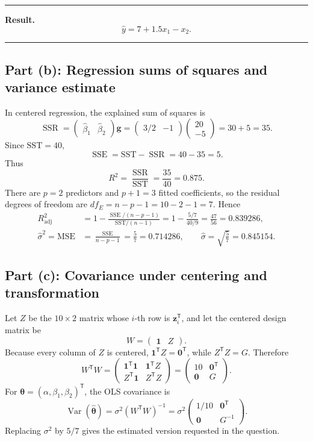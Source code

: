\documentclass[11pt]{article}
\newcommand{\trans}{\mathsf T}
\newcommand{\Var}{\operatorname{Var}}
\newcommand{\SSE}{\operatorname{SSE}}
\newcommand{\SSR}{\operatorname{SSR}}
\newcommand{\answer}[1]{\boxed{\displaystyle #1}}
\newenvironment{resultbox}
  {\par\medskip\noindent\begin{minipage}{\linewidth}
   \color{navy!90!black}\hrule\medskip\textbf{Result.}\ }
  {\medskip\hrule\end{minipage}\par\medskip}
\begin{document}
\begin{resultbox}
\[
  \answer{\hat y=7+1.5x_1-x_2}.
\]
\end{resultbox}

\subsection{Part (b): Regression sums of squares and variance estimate}

In centered regression, the explained sum of squares is
\[
 \SSR=\begin{pmatrix}\hat\beta_1&\hat\beta_2\end{pmatrix}\bm g
 =\begin{pmatrix}3/2&-1\end{pmatrix}
  \begin{pmatrix}20\\-5\end{pmatrix}
 =30+5=35.
\]
Since \(\mathrm{SST}=40\),
\[
 \SSE=\mathrm{SST}-\SSR=40-35=5.
\]
Thus
\[
 R^2=\frac{\SSR}{\mathrm{SST}}=\frac{35}{40}
 =\answer{0.875}.
\]
There are \(p=2\) predictors and \(p+1=3\) fitted coefficients, so the residual
degrees of freedom are \(df_E=n-p-1=10-2-1=7\). Hence
\begin{align*}
R_{\mathrm{adj}}^2
 &=1-\frac{\SSE/(n-p-1)}{\mathrm{SST}/(n-1)}
 =1-\frac{5/7}{40/9}
 =\frac{47}{56}
 =\answer{0.839286},\\
\hat\sigma^2=\mathrm{MSE}
&=\frac{\SSE}{n-p-1}=\answer{\frac57=0.714286},
\qquad
\hat\sigma=\sqrt{\frac57}=\answer{0.845154}.
\end{align*}

\subsection{Part (c): Covariance under centering and transformation}

Let \(Z\) be the \(10\times2\) matrix whose \(i\)-th row is
\(\bm z_i^\trans\), and let the centered design matrix be
\[
 W=\begin{pmatrix}\bm1&Z\end{pmatrix}.
\]
Because every column of \(Z\) is centered,
\(\bm1^\trans Z=\bm0^\trans\), while \(Z^\trans Z=G\). Therefore
\[
 W^\trans W
 =\begin{pmatrix}
 \bm1^\trans\bm1&\bm1^\trans Z\\
 Z^\trans\bm1&Z^\trans Z
 \end{pmatrix}
 =\begin{pmatrix}10&\bm0^\trans\\\bm0&G\end{pmatrix}.
\]
For \(\bm\theta=(\alpha,\beta_1,\beta_2)^\trans\), the OLS covariance is
\[
\Var(\hat{\bm\theta})
=\sigma^2(W^\trans W)^{-1}
=\sigma^2
\begin{pmatrix}
1/10&\bm0^\trans\\
\bm0&G^{-1}
\end{pmatrix}.
\]
Replacing \(\sigma^2\) by \(5/7\) gives the estimated version requested in
the question.
\end{document}
